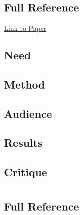 \documentclass[
	letterpaper, %
]{jdf}
\begin{document}
\section{\cite{Chang2015ImprovingRR}}
\subsection{Full Reference}

\href{https://www.sciencedirect.com/science/article/pii/S0346251X15000846}{Link to Paper}

\subsection{Need}

\subsection{Method}

\subsection{Audience}

\subsection{Results}

\subsection{Critique}

\section{\cite{shortestpathrepetitionscheduling}}
\subsection{Full Reference}
\end{document}
